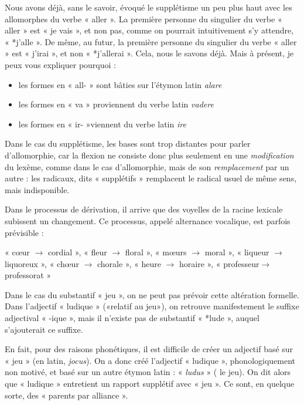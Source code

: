 Nous avons déjà, sans le savoir, évoqué le supplétisme un peu plus haut avec les allomorphes du verbe « aller ». La première personne du singulier du verbe « aller » est « je vais », et non pas, comme on pourrait intuitivement s’y attendre, « *j’alle ». De même, au futur, la première personne du singulier du verbe « aller » est « j’irai », et non « *j’allerai ». Cela, nous le savons déjà. Mais à présent, je peux vous expliquer pourquoi :
\begin{itemize}
\item les formes en « all- » sont bâties sur l’étymon latin \textit{alare}
\item les formes en « va » proviennent du verbe latin \textit{vadere}
\item les formes en « ir- »viennent du verbe latin \textit{ire}
\end{itemize}
Dans le cas du supplétisme, les bases sont trop distantes pour parler d’allomorphie, car la flexion ne consiste donc plus seulement en une \textit{modification} du lexème, comme dans le cas d’allomorphie, mais de son \textit{remplacement} par un autre : les radicaux, dits « supplétifs » remplacent le radical usuel de même sens, mais indisponible.

Dans le processus de dérivation, il arrive que des voyelles de la racine lexicale subissent un changement. Ce processus, appelé alternance vocalique, est parfois prévisible :

« cœur $\rightarrow$ cordial », « fleur $\rightarrow$ floral », « mœurs $\rightarrow$ moral », « liqueur $\rightarrow$ liquoreux », « chœur $\rightarrow$ chorale », « heure $\rightarrow$ horaire », « professeur$\rightarrow$professorat »

Dans le cas du substantif « jeu », on ne peut pas prévoir cette altération formelle. Dans l’adjectif « ludique » («relatif au jeu»), on retrouve manifestement le suffixe adjectival « -ique », mais il n’existe pas de substantif « *lude », auquel s’ajouterait ce suffixe.

En fait, pour des raisons phonétiques, il est difficile de créer un adjectif basé sur « jeu » (en latin, \textit{jocus}). On a donc créé l’adjectif « ludique », phonologiquement non motivé, et basé sur un autre étymon latin : « \textit{ludus} » ( le jeu). On dit alors que « ludique » entretient un rapport supplétif avec « jeu ». Ce sont, en quelque sorte, des « parents par alliance ».

